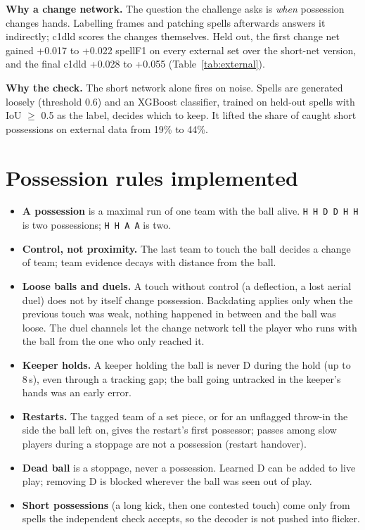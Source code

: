 \documentclass[10pt,a4paper]{article}
\newcommand{\code}[1]{\texttt{\small #1}}
\newcommand{\sF}{spellF1}
\begin{document}
\textbf{Why a change network.} The question the challenge asks is \emph{when} possession changes
hands. Labelling frames and patching spells afterwards answers it indirectly; c1dld scores the
changes themselves. Held out, the first change net gained +0.017 to +0.022 \sF{} on every external
set over the short-net version, and the final c1dld +0.028 to +0.055 (Table~\ref{tab:external}).

\textbf{Why the check.} The short network alone fires on noise. Spells are generated loosely
(threshold 0.6) and an XGBoost classifier, trained on held-out spells with IoU $\geq$ 0.5 as the
label, decides which to keep. It lifted the share of caught short possessions on external data from
19\% to 44\%.

\section{Possession rules implemented}

\begin{itemize}
  \item \textbf{A possession} is a maximal run of one team with the ball alive. \code{H H D D H H} is
        two possessions; \code{H H A A} is two.
  \item \textbf{Control, not proximity.} The last team to touch the ball decides a change of team;
        team evidence decays with distance from the ball.
  \item \textbf{Loose balls and duels.} A touch without control (a deflection, a lost aerial duel)
        does not by itself change possession. Backdating applies only when the previous touch was
        weak, nothing happened in between and the ball was loose. The duel channels let the change
        network tell the player who runs with the ball from the one who only reached it.
  \item \textbf{Keeper holds.} A keeper holding the ball is never D during the hold (up to 8\,s), even
        through a tracking gap; the ball going untracked in the keeper's hands was an early error.
  \item \textbf{Restarts.} The tagged team of a set piece, or for an unflagged throw-in the side the
        ball left on, gives the restart's first possessor; passes among slow players during a
        stoppage are not a possession (restart handover).
  \item \textbf{Dead ball} is a stoppage, never a possession. Learned D can be added to live play;
        removing D is blocked wherever the ball was seen out of play.
  \item \textbf{Short possessions} (a long kick, then one contested touch) come only from spells the
        independent check accepts, so the decoder is not pushed into flicker.
\end{itemize}
\end{document}
